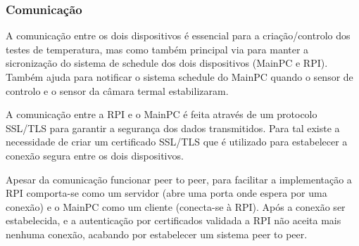 \subsubsection{Comunicação}     \label{sec:comunicacao}

A comunicação entre os dois dispositivos é essencial para a criação/controlo dos testes de temperatura,
mas como também principal via para manter a sicronização do sistema de schedule dos dois dispositivos (MainPC e RPI). 
Também ajuda para notificar o sistema schedule do MainPC quando o sensor de controlo e o sensor da câmara termal estabilizaram.

A comunicação entre a RPI e o MainPC é feita através de um protocolo SSL/TLS para garantir a
segurança dos dados transmitidos. Para tal existe a necessidade de criar um certificado SSL/TLS
que é utilizado para estabelecer a conexão segura entre os dois dispositivos.

Apesar da comunicação funcionar peer to peer, para facilitar a implementação a RPI comporta-se como
um servidor (abre uma porta onde espera por uma conexão) e o MainPC como um cliente (conecta-se à RPI).
Após a conexão ser estabelecida, e a autenticação por certificados validada a RPI não aceita mais nenhuma
conexão, acabando por estabelecer um sistema peer to peer.


